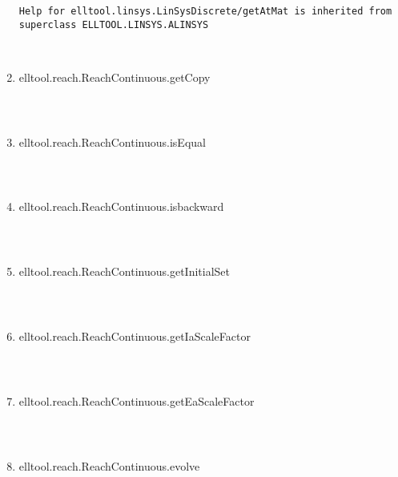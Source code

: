 \begin{enumerate}
\begin{lstlisting}
Help for elltool.linsys.LinSysDiscrete/getAtMat is inherited from superclass ELLTOOL.LINSYS.ALINSYS



\end{lstlisting}
\fontfamily{\familydefault}
\selectfont
\item {elltool.reach.ReachContinuous.getCopy}
\selectfont
\begin{lstlisting}



\end{lstlisting}
\fontfamily{\familydefault}
\selectfont
\item {elltool.reach.ReachContinuous.isEqual}
\selectfont
\begin{lstlisting}



\end{lstlisting}
\fontfamily{\familydefault}
\selectfont
\item {elltool.reach.ReachContinuous.isbackward}
\selectfont
\begin{lstlisting}



\end{lstlisting}
\fontfamily{\familydefault}
\selectfont
\item {elltool.reach.ReachContinuous.getInitialSet}
\selectfont
\begin{lstlisting}



\end{lstlisting}
\fontfamily{\familydefault}
\selectfont
\item {elltool.reach.ReachContinuous.getIaScaleFactor}
\selectfont
\begin{lstlisting}



\end{lstlisting}
\fontfamily{\familydefault}
\selectfont
\item {elltool.reach.ReachContinuous.getEaScaleFactor}
\selectfont
\begin{lstlisting}



\end{lstlisting}
\fontfamily{\familydefault}
\selectfont
\item {elltool.reach.ReachContinuous.evolve}
\selectfont
\begin{lstlisting}


\end{lstlisting}
\end{enumerate}
